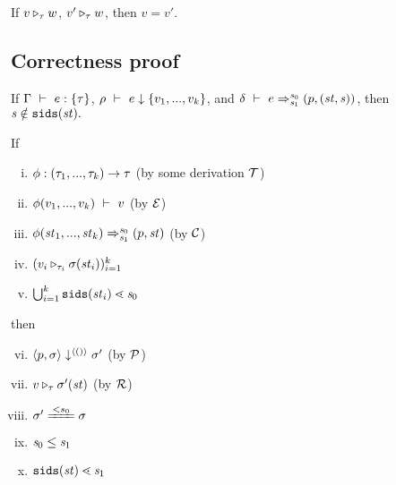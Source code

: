 \begin{lem}
	If $\ValRep{v}{\tau}{w}$, $\ValRep{v'}{\tau}{w}$,
	then $v=v'$.
\end{lem}


\subsection{Correctness proof}

\begin{lem}[???] \label{lem-seqs-sids}
	If $\Type{\Gam}{e}{\tseq{\tau}}$,  $\Eval{\rho}{e}{\Seqk{v}}$,
	and $\Trans{\del}{e}{\s_0}{\s_1}{\sfun{p}{(\st,\s)}}$,
	then $\s \notin \sids{\st}.$
\end{lem}

\begin{lem}
	\label{function-correctness}
	If 
	\begin{enumerate}[(i)]
	\item $\Typef{\hcall}{\replc{k}{\tau}}\tau$ (by some derivation $\MT$)
	\item $\EvalF{\hcall}{\replc{k}{v}}{v}$ (by $\ME$)
	\item $\Transf{\hcall}{\replc k {\st}} {\s_0} {\s_1} {\sfun{p}{\st}}$ (by $\MC$)
 	\item $(\ValRep{v_i}{\tau_i}{\sgm(\st_i)})^k_{i=1}$
 	\item $\bigcup^k_{i=1}\sids{\st_i} \.< \s_0$
	\end{enumerate}
 	then 
 	\begin{enumerate}[(i)]
 		\setcounter{enumi}{5}
 		\item $\seval{p}{\sgm}{\vunit}{\sgm'}$ (by $\MP$)
 		\item $\ValRep{v}{\tau}{\sgm'(\st)}$ (by $\MR$)
 		\item $\sgm' \ConEq{s_0} \sgm $
 	    \item $\s_0 \le \s_1$
 		\item $\sids{\st} \.< \s_1$

 	\end{enumerate}
\end{lem}

